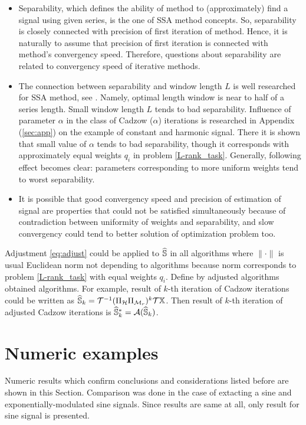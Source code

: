 \documentclass[12pt,a4paper,fleqn,leqno]{article}
\begin{document}
\begin{itemize}
\item
Separability, which defines the ability of method to (approximately) find a signal using given series, is the one of SSA method concepts. So, separability is closely connected with precision of first iteration of method. Hence, it is naturally to assume that precision of first iteration is connected with method's convergency speed. Therefore, questions about separability are related to convergency speed of iterative methods.
\item
The connection between separability and window length $L$ is well researched for SSA method, see \cite{Golyandina2010}. Namely, optimal length window is near to half of a series length. Small window length $L$ tends to bad separability. Influence of parameter $\alpha$ in the class of Cadzow ($\alpha$) iterations is researched in Appendix (\ref{sec:app}) on the example of constant and harmonic signal. There it is shown that small value of $\alpha$ tends to bad separability, though it corresponds with approximately equal weights $q_i$ in problem \eqref{L-rank_task}. Generally, following effect becomes clear: parameters corresponding to more uniform weights tend to worst separability.
\item
It is possible that good convergency speed and precision of estimation of signal are properties that could not be satisfied simultaneously because of contradiction between uniformity of weights and separability, and slow convergency could tend to better solution of optimization problem too.
\end{itemize}

\begin{remark}
\label{rem:adjust}
Adjustment \eqref{eq:adjust} could be applied to $\widehat{\mathbb{S}}$ in all algorithms where $\|\cdot\|$ is usual Euclidean norm not depending to algorithms because norm corresponds to problem \eqref{L-rank_task} with equal weights $q_i$. Define by adjusted algorithms obtained algorithms.
For example, result of $k$-th iteration of Cadzow iterations could be written as $\widehat{\mathbb{S}}_k = \mathcal{T}^{-1}(\Pi_{\mathcal{H}} \Pi_{\mathcal{M}_r})^k \mathcal{T} \mathbb{X}$. Then result of $k$-th iteration of adjusted Cadzow iterations is $\widehat{\mathbb{S}}_k^*=\mathcal{A}(\widehat{\mathbb{S}}_k)$.
\end{remark}

\section{Numeric examples}
\label{sec:simul}
Numeric results which confirm conclusions and considerations listed before are shown in this Section. Comparison was done in the case of extacting a sine and exponentially-modulated sine signals.
Since results are same at all, only result for sine signal is presented.
\end{document}
